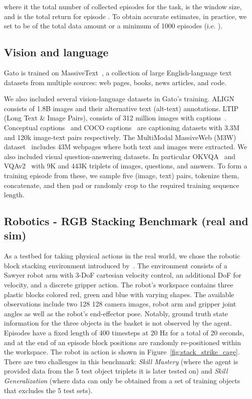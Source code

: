\documentclass[10pt]{article} \usepackage[accepted]{tmlr}
\newcommand{\model}{{Gato}}
\begin{document}
where  it the total number of collected episodes for the task,  is the window size, and  is the total return for episode .
To obtain accurate estimates, in practice, we set  to be  of the total data amount or a minimum of 1000 episodes (i.e. ).
\vskip 0.4cm
\subsection{Vision and language}
\label{sec:vision-and-language}
\vskip 0.2cm
\model{} is trained on MassiveText~\citep{rae2021scaling}, a collection of large English-language text datasets from multiple sources: web pages, books, news articles, and code.


We also included several vision-language datasets in \model{}'s training.
ALIGN~\citep{jia2021scaling} consists of 1.8B images and their alternative text (alt-text) annotations. 
LTIP (Long Text \& Image Pairs), consists of 312 million images with captions~\citep{Alayrac2022FlamingoAV}.
Conceptual captions~\citep{sharma-etal-2018-conceptual} and COCO captions~\citep{chen2015microsoft} are captioning datasets with 3.3M and 120k image-text pairs respectively.
The MultiModal MassiveWeb (M3W) dataset~\citep{Alayrac2022FlamingoAV} includes 43M webpages where both text and images were extracted. 
We also included visual question-answering datasets. In particular OKVQA~\citep{marino2019ok} and VQAv2~\citep{antol2015vqa}
with 9K and 443K triplets of images, questions, and answers.
To form a training episode from these, we sample five (image, text) pairs, tokenize them, concatenate, and then pad or randomly crop to the required training sequence length.
\vskip 0.4cm
\subsection{Robotics - RGB Stacking Benchmark (real and sim)}
\vskip 0.2cm
As a testbed for taking physical actions in the real world, we chose the robotic block stacking environment introduced by~\citet{lee2021beyond}. The environment consists of a Sawyer robot arm with 3-DoF cartesian velocity control, an additional DoF for velocity, and a discrete gripper action. The robot's workspace contains three plastic blocks colored red, green and blue with varying shapes.
The available observations include two 128  128 camera images, robot arm and gripper joint angles as well as the robot's end-effector pose. Notably, ground truth state information for the three objects in the basket is not observed by the agent. Episodes have a fixed length of 400 timesteps at 20 Hz for a total of 20 seconds, and at the end of an episode block positions are randomly re-positioned within the workspace. The robot in action is shown in Figure~\ref{fig:stack_strike_cage}. There are two challenges in this benchmark: \emph{Skill Mastery} (where the agent is provided data from the 5 test object triplets it is later tested on) and \emph{Skill Generalization} (where data can only be obtained from a set of training objects that excludes the 5 test sets).
\end{document}
